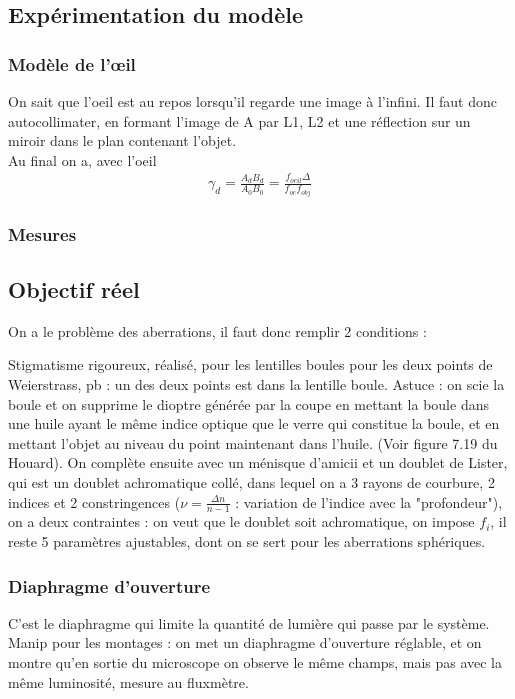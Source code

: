 \documentclass[12pt,prb,aps,epsf]{article}
\begin{document}
\subsection{Expérimentation du modèle}
\subsubsection{Modèle de l'œil}
On sait que l'oeil est au repos lorsqu'il regarde une image à l'infini. Il faut donc autocollimater, en formant l'image de A par L1, L2 et une réflection sur un miroir dans le plan contenant l'objet.\\
Au final on a, avec l'oeil 
\begin{eqnarray}
\gamma_d = \frac{A_dB_d}{A_0B_0} = \frac{f_{oeil}\Delta}{f_{oc}f_{obj}}
\end{eqnarray}

\subsubsection{Mesures}

\subsection{Objectif réel}
On a le problème des aberrations, il faut donc remplir 2 conditions : 

Stigmatisme rigoureux, réalisé, pour les lentilles boules pour les deux points de Weierstrass, pb : un des deux points est dans la lentille boule. Astuce : on scie la boule et on supprime le dioptre générée par la coupe en mettant la boule dans une huile ayant le même indice optique que le verre qui constitue la boule, et en mettant l'objet au niveau du point maintenant dans l'huile. (Voir figure 7.19 du Houard). On complète ensuite avec un ménisque d'amicii et un doublet de Lister, qui est un doublet achromatique collé, dans lequel on a 3 rayons de courbure, 2 indices et 2 constringences ($\nu = \frac{\Delta n}{n-1}$ : variation de l'indice avec la "profondeur"), on a deux contraintes : on veut que le doublet soit achromatique, on impose $f_i$, il reste 5 paramètres ajustables, dont on se sert pour les aberrations sphériques.

\subsubsection{Diaphragme d'ouverture}
C'est le diaphragme qui limite la quantité de lumière qui passe par le système.\\
Manip pour les montages : on met un diaphragme d'ouverture réglable, et on montre qu'en sortie du microscope on observe le même champs, mais pas avec la même luminosité, mesure au fluxmètre.
\end{document}
